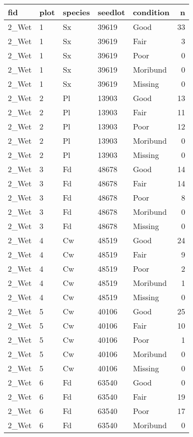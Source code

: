 \documentclass[
]{article}
\begin{document}
\begin{tabular}{l|l|l|l|l|r}
\hline
fid & plot & species & seedlot & condition & n\\
\hline
2\_Wet & 1 & Sx & 39619 & Good & 33\\
\hline
2\_Wet & 1 & Sx & 39619 & Fair & 3\\
\hline
2\_Wet & 1 & Sx & 39619 & Poor & 0\\
\hline
2\_Wet & 1 & Sx & 39619 & Moribund & 0\\
\hline
2\_Wet & 1 & Sx & 39619 & Missing & 0\\
\hline
2\_Wet & 2 & Pl & 13903 & Good & 13\\
\hline
2\_Wet & 2 & Pl & 13903 & Fair & 11\\
\hline
2\_Wet & 2 & Pl & 13903 & Poor & 12\\
\hline
2\_Wet & 2 & Pl & 13903 & Moribund & 0\\
\hline
2\_Wet & 2 & Pl & 13903 & Missing & 0\\
\hline
2\_Wet & 3 & Fd & 48678 & Good & 14\\
\hline
2\_Wet & 3 & Fd & 48678 & Fair & 14\\
\hline
2\_Wet & 3 & Fd & 48678 & Poor & 8\\
\hline
2\_Wet & 3 & Fd & 48678 & Moribund & 0\\
\hline
2\_Wet & 3 & Fd & 48678 & Missing & 0\\
\hline
2\_Wet & 4 & Cw & 48519 & Good & 24\\
\hline
2\_Wet & 4 & Cw & 48519 & Fair & 9\\
\hline
2\_Wet & 4 & Cw & 48519 & Poor & 2\\
\hline
2\_Wet & 4 & Cw & 48519 & Moribund & 1\\
\hline
2\_Wet & 4 & Cw & 48519 & Missing & 0\\
\hline
2\_Wet & 5 & Cw & 40106 & Good & 25\\
\hline
2\_Wet & 5 & Cw & 40106 & Fair & 10\\
\hline
2\_Wet & 5 & Cw & 40106 & Poor & 1\\
\hline
2\_Wet & 5 & Cw & 40106 & Moribund & 0\\
\hline
2\_Wet & 5 & Cw & 40106 & Missing & 0\\
\hline
2\_Wet & 6 & Fd & 63540 & Good & 0\\
\hline
2\_Wet & 6 & Fd & 63540 & Fair & 19\\
\hline
2\_Wet & 6 & Fd & 63540 & Poor & 17\\
\hline
2\_Wet & 6 & Fd & 63540 & Moribund & 0\\

\end{tabular}
\end{document}
